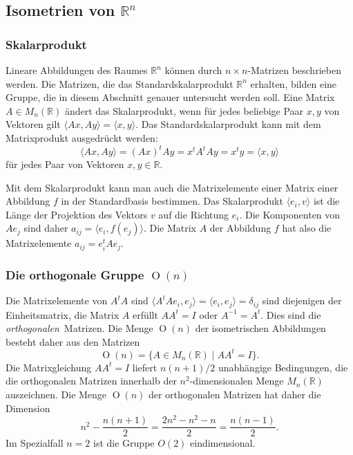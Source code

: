 %
%
\subsection{Isometrien von $\mathbb{R}^n$
\label{buch:gruppen:isometrien}}

\subsubsection{Skalarprodukt}
Lineare Abbildungen des Raumes $\mathbb{R}^n$ können durch
$n\times n$-Matrizen beschrieben werden.
Die Matrizen, die das Standardskalarprodukt $\mathbb{R}^n$ erhalten,
bilden eine Gruppe, die in diesem Abschnitt genauer untersucht werden soll.
Eine Matrix $A\in M_{n}(\mathbb{R})$ ändert das Skalarprodukt, wenn
für jedes beliebige Paar $x,y$ von Vektoren gilt
$\langle Ax,Ay\rangle = \langle x,y\rangle$.
Das Standardskalarprodukt kann mit dem Matrixprodukt ausgedrückt werden:
\[
\langle Ax,Ay\rangle
=
(Ax)^tAy
=
x^tA^tAy
=
x^ty
=
\langle x,y\rangle
\]
für jedes Paar von Vektoren $x,y\in\mathbb{R}$.

Mit dem Skalarprodukt kann man auch die Matrixelemente einer Matrix
einer Abbildung $f$ in der Standardbasis bestimmen.
Das Skalarprodukt $\langle e_i, v\rangle$ ist die Länge der Projektion
des Vektors $v$ auf die Richtung $e_i$.
Die Komponenten von $Ae_j$ sind daher $a_{ij}=\langle e_i,f(e_j)\rangle$.
Die Matrix $A$ der Abbildung $f$ hat also die Matrixelemente
$a_{ij}=e_i^tAe_j$.

\subsubsection{Die orthogonale Gruppe $\operatorname{O}(n)$}
Die Matrixelemente von $A^tA$ sind
$\langle A^tAe_i, e_j\rangle =\langle e_i,e_j\rangle = \delta_{ij}$
sind diejenigen der Einheitsmatrix,
die Matrix $A$ erfüllt $AA^t=I$ oder $A^{-1}=A^t$.
Dies sind die {\em orthogonalen} Matrizen.
Die Menge $\operatorname{O}(n)$ der isometrischen Abbildungen besteht
daher aus den Matrizen
\[
\operatorname{O}(n)
=
\{ A\in M_n(\mathbb{R})\;|\; AA^t=I\}.
\]
Die Matrixgleichung $AA^t=I$ liefert $n(n+1)/2$ unabhängige Bedingungen,
die die orthogonalen Matrizen innerhalb der $n^2$-dimensionalen
Menge $M_n(\mathbb{R})$ auszeichnen.
Die Menge $\operatorname{O}(n)$ der orthogonalen Matrizen hat daher
die Dimension
\[
n^2 - \frac{n(n+1)}{2}
=
\frac{2n^2-n^2-n}{2}
=
\frac{n(n-1)}2.
\]
Im Spezialfall $n=2$ ist die Gruppe $O(2)$ eindimensional.

